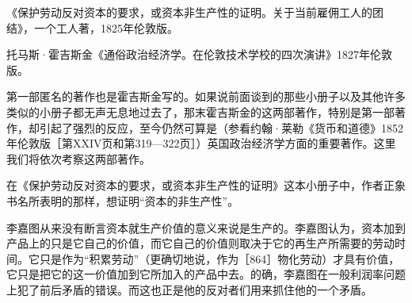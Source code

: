 
《保护劳动反对资本的要求，或资本非生产性的证明。关于当前雇佣工人的团结》，一个工人著，1825年伦敦版。

托马斯·霍吉斯金《通俗政治经济学。在伦敦技术学校的四次演讲》1827年伦敦版。

第一部匿名的著作也是霍吉斯金写的。如果说前面谈到的那些小册子以及其他许多类似的小册子都无声无息地过去了，那末霍吉斯金的这两部著作，特别是第一部著作，却引起了强烈的反应，至今仍然可算是（参看约翰·莱勒《货币和道德》1852年伦敦版［第XXIV页和第319—322页］）英国政治经济学方面的重要著作。这里我们将依次考察这两部著作。


在《保护劳动反对资本的要求，或资本非生产性的证明》这本小册子中，作者正象书名所表明的那样，想证明“资本的非生产性”。

李嘉图从来没有断言资本就生产价值的意义来说是生产的。李嘉图认为，资本加到产品上的只是它自己的价值，而它自己的价值则取决于它的再生产所需要的劳动时间。它只是作为“积累劳动”（更确切地说，作为［864］物化劳动）才具有价值，它只是把它的这一价值加到它所加入的产品中去。的确，李嘉图在一般利润率问题上犯了前后矛盾的错误。而这也正是他的反对者们用来抓住他的一个矛盾。

